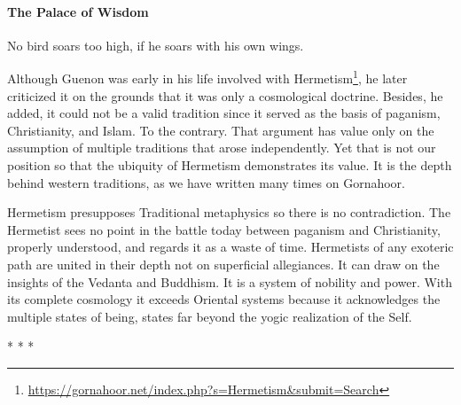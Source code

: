 \paragraph{The Palace of Wisdom}


\begin{quotex}
No bird soars too high, if he soars with his own wings.
\end{quotex}


Although Guenon was early in his life involved with Hermetism\footnote{\url{https://gornahoor.net/index.php?s=Hermetism&submit=Search}}, he later criticized it on the grounds that it was only a cosmological doctrine. Besides, he added, it could not be a valid tradition since it served as the basis of paganism, Christianity, and Islam. To the contrary. That argument has value only on the assumption of multiple traditions that arose independently. Yet that is not our position so that the ubiquity of Hermetism demonstrates its value. It is the depth behind western traditions, as we have written many times on Gornahoor.

Hermetism presupposes Traditional metaphysics so there is no contradiction. The Hermetist sees no point in the battle today between paganism and Christianity, properly understood, and regards it as a waste of time. Hermetists of any exoteric path are united in their depth not on superficial allegiances. It can draw on the insights of the Vedanta and Buddhism. It is a system of nobility and power. With its complete cosmology it exceeds Oriental systems because it acknowledges the multiple states of being, states far beyond the yogic realization of the Self.



\begin{center}* * *\end{center}

